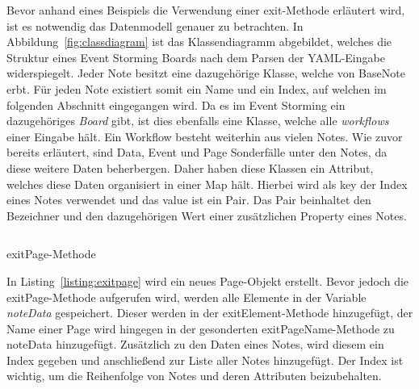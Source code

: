 Bevor anhand eines Beispiels die Verwendung einer exit-Methode erläutert wird, ist es notwendig das Datenmodell genauer zu betrachten.
In Abbildung~\ref{fig:classdiagram} ist das Klassendiagramm abgebildet, welches die Struktur eines Event Storming Boards nach dem Parsen der YAML-Eingabe widerspiegelt.
Jeder Note besitzt eine dazugehörige Klasse, welche von BaseNote erbt.
Für jeden Note existiert somit ein Name und ein Index, auf welchen im folgenden Abschnitt eingegangen wird.
Da es im Event Storming ein dazugehöriges \textit{Board} gibt, ist dies ebenfalls eine Klasse, welche alle \textit{workflows} einer Eingabe hält.
Ein Workflow besteht weiterhin aus vielen Notes.
Wie zuvor bereits erläutert, sind Data, Event und Page Sonderfälle unter den Notes, da diese weitere Daten beherbergen.
Daher haben diese Klassen ein Attribut, welches diese Daten organisiert in einer Map hält.
Hierbei wird als key der Index eines Notes verwendet und das value ist ein Pair.
Das Pair beinhaltet den Bezeichner und den dazugehörigen Wert einer zusätzlichen Property eines Notes.

\begin{listing}[!ht]
    \inputminted[xleftmargin=20pt,linenos,firstnumber=106]{java}{listings/3.1.3/ExitPage.java}
    \caption{exitPage-Methode}
    \label{listing:exitpage}
\end{listing}

In Listing~\ref{listing:exitpage} wird ein neues Page-Objekt erstellt.
Bevor jedoch die exitPage-Methode aufgerufen wird, werden alle Elemente in der Variable \textit{noteData} gespeichert.
Dieser werden in der exitElement-Methode hinzugefügt, der Name einer Page wird hingegen in der gesonderten exitPageName-Methode zu noteData hinzugefügt.
Zusätzlich zu den Daten eines Notes, wird diesem ein Index gegeben und anschließend zur Liste aller Notes hinzugefügt.
Der Index ist wichtig, um die Reihenfolge von Notes und deren Attributen beizubehalten.
